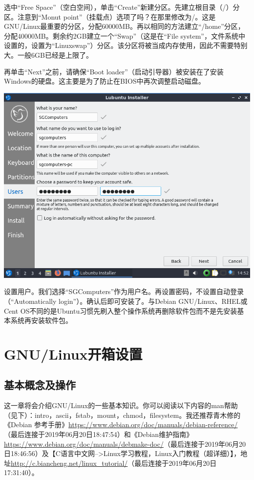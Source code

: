 选中“Free Space”（空白空间），单击“Create”新建分区。先建立根目录（/）分区。注意到“Monut point”（挂载点）选项了吗？在那里修改为/。这是GNU/Linux最重要的分区，分配60000MB。再以相同的方法建立“/home”分区，分配40000MB。剩余约2GB建立一个“Swap”（这是在“File system”，文件系统中设置的，设置为“Linuxswap”）分区。该分区将被当成内存使用，因此不需要特别大。一般6GB已经是上限了。\par
再单击“Next”之前，请确保“Boot loader”（启动引导器）被安装在了安装Windows的硬盘。这主要是为了防止在BIOS中再次调整启动磁盘。
\begin{center}
	\includegraphics[width=0.7\linewidth]{pic/lubinst12}
\end{center} \par
设置用户。我们选择“SGComputers”作为用户名。再设置密码，不设置自动登录（“Automatically login”）。确认后即可安装了。与Debian GNU/Linux、RHEL或Cent OS不同的是Ubuntu习惯先刷入整个操作系统再删除软件包而不是先安装基本系统再安装软件包。
\chapter{GNU/Linux开箱设置}
\section{基本概念及操作}
这一章将会介绍GNU/Linux的一些基本知识。你可以阅读以下内容的man帮助（见下）：intro，ascii，fstab，mount，chmod，filesystem。我还推荐青木修的《Debian 参考手册》\url{https://www.debian.org/doc/manuals/debian-reference/}（最后连接于2019年06月20日18:47:54）和《Debian维护指南》\url{https://www.debian.org/doc/manuals/debmake-doc/}（最后连接于2019年06月20日18:46:56）及【C语言中文网-->Linux学习教程，Linux入门教程（超详细）】，地址\url{http://c.biancheng.net/linux_tutorial/}（最后连接于2019年06月20日17:31:40）。\par
